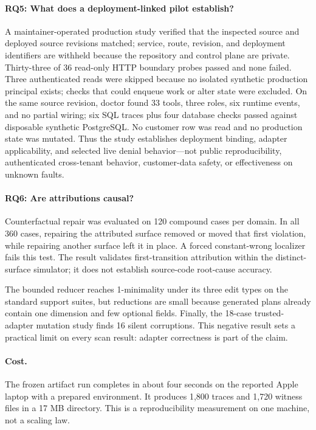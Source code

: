 \paragraph{RQ5: What does a deployment-linked pilot establish?}
A maintainer-operated production study verified that the inspected source and deployed source revisions matched; service, route, revision, and deployment identifiers are withheld because the repository and control plane are private. Thirty-three of 36 read-only HTTP boundary probes passed and none failed. Three authenticated reads were skipped because no isolated synthetic production principal exists; checks that could enqueue work or alter state were excluded. On the same source revision, doctor found 33 tools, three roles, six runtime events, and no partial wiring; six SQL traces plus four database checks passed against disposable synthetic PostgreSQL. No customer row was read and no production state was mutated. Thus the study establishes deployment binding, adapter applicability, and selected live denial behavior---not public reproducibility, authenticated cross-tenant behavior, customer-data safety, or effectiveness on unknown faults.

\paragraph{RQ6: Are attributions causal?}
Counterfactual repair was evaluated on 120 compound cases per domain. In all 360 cases, repairing the attributed surface removed or moved that first violation, while repairing another surface left it in place. A forced constant-wrong localizer fails this test. The result validates first-transition attribution within the distinct-surface simulator; it does not establish source-code root-cause accuracy.

The bounded reducer reaches 1-minimality under its three edit types on the standard support suites, but reductions are small because generated plans already contain one dimension and few optional fields. Finally, the 18-case trusted-adapter mutation study finds 16 silent corruptions. This negative result sets a practical limit on every scan result: adapter correctness is part of the claim.

\paragraph{Cost.}
The frozen artifact run completes in about four seconds on the reported Apple laptop with a prepared environment. It produces 1,800 traces and 1,720 witness files in a 17 MB directory. This is a reproducibility measurement on one machine, not a scaling law.

